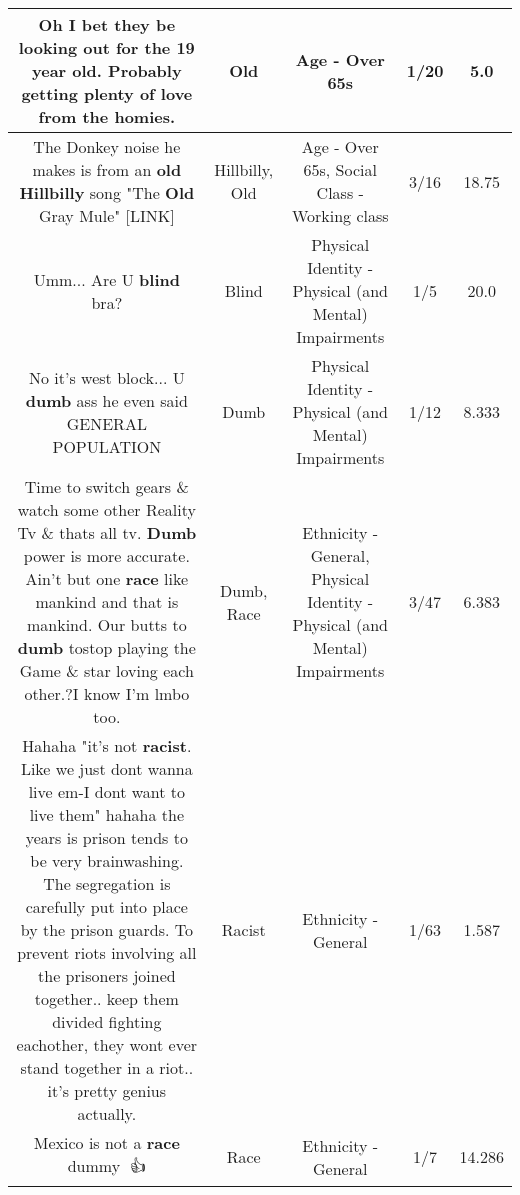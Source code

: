 \documentclass[11pt]{article}
\newlength\mylength
\begin{document}
\begin{center}
\begin{longtable}{|C{.65\mylength}|C{.30\mylength}|C{.12\mylength}|C{.12\mylength}|C{.12\mylength}|}
  \small Oh I bet they be looking out for the 19 year \textbf{old}. Probably getting plenty of love from the homies.\normalsize   & Old & Age - Over 65s & 1/20 & 5.0 \\  \hline
  \small The Donkey noise he makes is from an \textbf{old} \textbf{Hillbilly} song "The \textbf{Old} Gray Mule"   [LINK] \normalsize   & Hillbilly, Old & Age - Over 65s, Social Class - Working class & 3/16 & 18.75 \\  \hline
  \small Umm... Are U \textbf{blind} bra?\normalsize   & Blind & Physical Identity - Physical (and Mental) Impairments & 1/5 & 20.0 \\  \hline
  \small No it's west block... U \textbf{dumb} ass he even said GENERAL POPULATION\normalsize   & Dumb & Physical Identity - Physical (and Mental) Impairments & 1/12 & 8.333 \\  \hline
  \small Time to switch gears \& watch some other Reality Tv \& thats all tv. \textbf{Dumb} power is more accurate. Ain't but one \textbf{race} like mankind and that is mankind. Our  butts to \textbf{dumb} tostop playing the Game \& star loving each other.?I know I'm lmbo too.\normalsize   & Dumb, Race & Ethnicity - General, Physical Identity - Physical (and Mental) Impairments & 3/47 & 6.383 \\  \hline
  \small Hahaha "it's not \textbf{racist}. Like we just dont wanna live em-I dont want to live them" hahaha the years is prison tends to be very brainwashing. The segregation is carefully put into place by the prison guards. To prevent riots involving all the prisoners joined together.. keep them divided fighting eachother, they wont ever stand together in a riot.. it's pretty genius actually.\normalsize   & Racist & Ethnicity - General & 1/63 & 1.587 \\  \hline
  \small Mexico is not a \textbf{race} dummy 🤣👍\normalsize   & Race & Ethnicity - General & 1/7 & 14.286 \\  \hline

\end{longtable}
\end{center}
\end{document}
